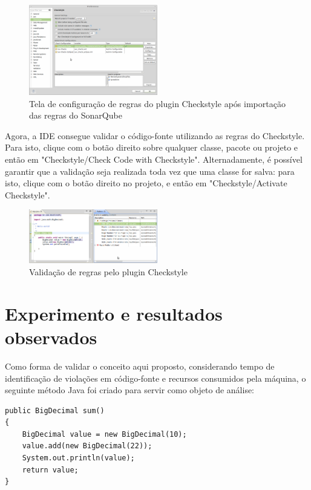 \documentclass[12pt,journal,compsoc]{IEEEtran}
\begin{document}
\begin{figure}[ht!]
\centering
\includegraphics[width=0.5\textwidth]{img/eclipse-checkstyle-01}
\caption{Tela de configuração de regras do plugin Checkstyle após importação das regras do SonarQube}
\label{eclipse-checkstyle-01}
\end{figure}

Agora, a IDE consegue validar o código-fonte utilizando as regras do Checkstyle. Para isto, clique com o botão direito sobre qualquer classe, pacote ou projeto e então em "Checkstyle/Check Code with Checkstyle". Alternadamente, é possível garantir que a validação seja realizada toda vez que uma classe for salva: para isto, clique com o botão direito no projeto, e então em "Checkstyle/Activate Checkstyle".

\begin{figure}[ht!]
\centering
\includegraphics[width=0.5\textwidth]{img/eclipse-checkstyle-02}
\caption{Validação de regras pelo plugin Checkstyle}
\label{eclipse-checkstyle-02}
\end{figure}


\section{Experimento e resultados observados}

Como forma de validar o conceito aqui proposto, considerando tempo de identificação de violações em código-fonte e recursos consumidos pela máquina, o seguinte método Java foi criado para servir como objeto de análise:

\begingroup
\fontsize{9pt}{10pt}\selectfont
\begin{verbatim}
public BigDecimal sum()
{
    BigDecimal value = new BigDecimal(10);
    value.add(new BigDecimal(22));
    System.out.println(value);
    return value;
}
\end{verbatim}
\endgroup
\end{document}
